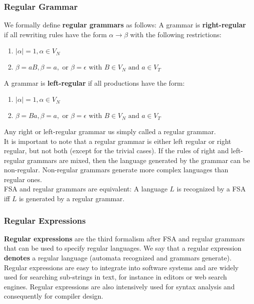 \subsubsection{Regular Grammar}
We formally define \textbf{regular grammars} as follows:
A grammar is \textbf{right-regular} if all rewriting rules have the form
$\alpha \rightarrow \beta$ with the following restrictions:
\begin{enumerate}
  \item $\lvert \alpha \rvert = 1, \alpha \in V_N$
  \item $\beta = aB, \beta = a, \text{ or } \beta = \epsilon \text{ with } B \in V_N \text{ and } a \in V_T$
\end{enumerate}
A grammar is \textbf{left-regular} if all productions have the form:
\begin{enumerate}
  \item $\lvert \alpha \rvert = 1, \alpha \in V_N$
  \item $\beta = Ba, \beta = a, \text{ or } \beta = \epsilon \text{ with } B \in V_N \text{ and } a \in V_T$
\end{enumerate}
Any right or left-regular grammar us simply called a regular grammar.\\

It is important to note that a regular grammar is either left regular or right regular, but not both (except for the trivial cases).
If the rules of right and left-regular grammars are mixed, then the language generated by the grammar can be non-regular.
Non-regular grammars generate more complex languages than regular ones.\\

FSA and regular grammars are equivalent: A language $L$ is recognized by a FSA iff $L$ is generated by a regular grammar.

\subsubsection{Regular Expressions}
\textbf{Regular expressions} are the third formalism after FSA and regular grammars that can be used 
to specify regular languages. We say that a regular expression \textbf{denotes} a regular language
(automata recognized and grammars generate). Regular expressions are easy to integrate into
software systems and are widely used for searching sub-strings in text, 
for instance in editors or web search engines.
Regular expressions are also intensively used for syntax analysis and consequently for compiler design.\\

